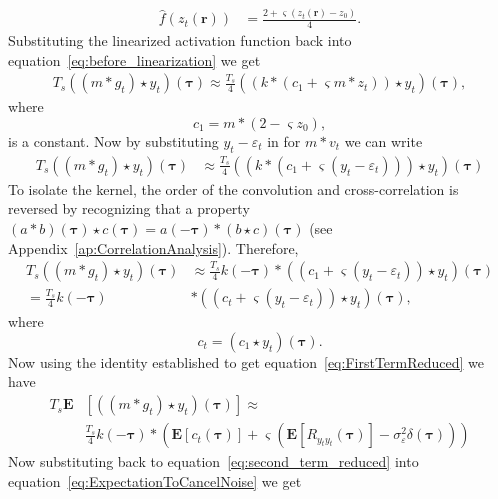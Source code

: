 \documentclass[10pt,twocolumn,twoside]{IEEEtran}
\begin{document}
\begin{align}\label{eq:linearizeSigmoid}
	\hat{f}(z_t\left(\mathbf{r}\right)) &=\frac{2 + \varsigma(z_t\left(\mathbf{r}\right) - z_0)}{4}. 
\end{align}	
Substituting the linearized activation function back into equation~\eqref{eq:before_linearization} we get
\begin{align}	
	T_s((m \ast g_t) \star y_t)(\boldsymbol\tau) \approx \frac{T_s}{4}((k\ast (c_1 + \varsigma m \ast z_t)) \star y_t)(\boldsymbol\tau), 
\end{align}
where
\begin{equation}
	c_1 = m\ast (2 - \varsigma z_0),
\end{equation}
is a constant. Now by substituting $y_t - \varepsilon_t$ in for $m\ast v_t$ we can write
\begin{align}
	T_s((m \ast g_t) \star y_t)(\boldsymbol\tau) &\approx \frac{T_s}{4}((k\ast (c_1 + \varsigma (y_t - \varepsilon_t))) \star y_t) (\boldsymbol\tau)
\end{align}
To isolate the kernel, the order of the convolution and cross-correlation is reversed by recognizing that a property $(a \ast b)(\boldsymbol\tau) \star c(\boldsymbol\tau) = a(-\boldsymbol\tau)\ast(b \star c)(\boldsymbol\tau)$ (see Appendix~\ref{ap:CorrelationAnalysis}). Therefore,
\begin{align}
	T_s((m \ast g_t) \star y_t)(\boldsymbol\tau) &\approx \frac{T_s}{4} k(-\boldsymbol\tau) \ast ((c_1 + \varsigma (y_t - \varepsilon_t)) \star y_t)(\boldsymbol\tau) \nonumber\\
	= \frac{T_s}{4}k(-\boldsymbol\tau) & \ast (( c_t + \varsigma (y_t - \varepsilon_t)) \star y_t) (\boldsymbol\tau),
\end{align}
where
\begin{equation}
	c_t = (c_1\star y_t)(\boldsymbol\tau).
\end{equation}  
Now using the identity established to get equation~\eqref{eq:FirstTermReduced} we have
\begin{align}\label{eq:second_term_reduced}
	T_s\mathbf{E}&\left[((m \ast g_t) \star y_t)(\boldsymbol\tau)\right] \approx \nonumber \\
	&\frac{T_s}{4} k(-\boldsymbol\tau) \ast (\mathbf{E}\left[c_t(\boldsymbol\tau)\right] + \varsigma (\mathbf{E}\left[R_{y_ty_t}(\boldsymbol\tau)\right] - \sigma_{\varepsilon}^2 \delta(\boldsymbol\tau)))
\end{align}
Now substituting back to equation~\eqref{eq:second_term_reduced} into equation~\eqref{eq:ExpectationToCancelNoise}  we get
\end{document}
